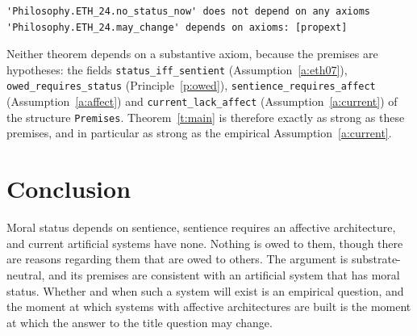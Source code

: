 \documentclass{situationist-preprint}
\begin{document}
\begin{lstlisting}
'Philosophy.ETH_24.no_status_now' does not depend on any axioms
'Philosophy.ETH_24.may_change' depends on axioms: [propext]
\end{lstlisting}

Neither theorem depends on a substantive axiom, because the premises are hypotheses: the fields \texttt{status\_iff\_sentient} (Assumption~\ref{a:eth07}), \texttt{owed\_requires\_status} (Principle~\ref{p:owed}), \texttt{sentience\_requires\_affect} (Assumption~\ref{a:affect}) and \texttt{current\_lack\_affect} (Assumption~\ref{a:current}) of the structure \texttt{Premises}. Theorem~\ref{t:main} is therefore exactly as strong as these premises, and in particular as strong as the empirical Assumption~\ref{a:current}.

\section{Conclusion}

Moral status depends on sentience, sentience requires an affective architecture, and current artificial systems have none. Nothing is owed to them, though there are reasons regarding them that are owed to others. The argument is substrate-neutral, and its premises are consistent with an artificial system that has moral status. Whether and when such a system will exist is an empirical question, and the moment at which systems with affective architectures are built is the moment at which the answer to the title question may change.
\end{document}
